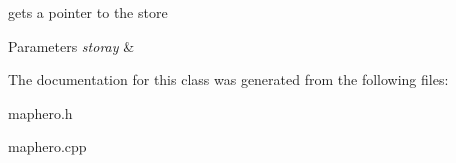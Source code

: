 gets a pointer to the store 


\begin{DoxyParams}{Parameters}
{\em storay} & \\
\hline
\end{DoxyParams}


The documentation for this class was generated from the following files\-:\begin{DoxyCompactItemize}
\item 
maphero.\-h\item 
maphero.\-cpp\end{DoxyCompactItemize}
